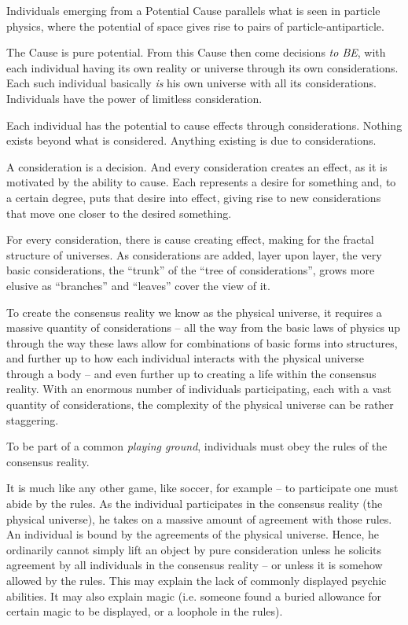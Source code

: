 \documentclass[11pt]{article}
\begin{document}
Individuals emerging from a Potential Cause parallels what is seen in particle
physics, where the potential of space gives rise to pairs of
particle-antiparticle.

The Cause is pure potential. From this Cause then come decisions {\em to BE},
with each individual having its own reality or universe through its own
considerations. Each such individual basically {\em is} his own universe with
all its considerations. Individuals have the power of limitless consideration.

Each individual has the potential to cause effects through considerations.
Nothing exists beyond what is considered. Anything existing is due to
considerations.

A consideration is a decision. And every consideration creates an effect, as it
is motivated by the ability to cause. Each represents a desire for something
and, to a certain degree, puts that desire into effect, giving rise to new
considerations that move one closer to the desired something. 

For every consideration, there is cause creating effect, making for the fractal
structure of universes. As considerations are added, layer upon layer, the very
basic considerations, the ``trunk'' of the ``tree of considerations'', grows more
elusive as ``branches'' and ``leaves'' cover the view of it.

To create the consensus reality we know as the physical universe, it requires a
massive quantity of considerations -- all the way from the basic laws of physics
up through the way these laws allow for combinations of basic forms into
structures, and further up to how each individual interacts with the physical
universe through a body -- and even further up to creating a life within the
consensus reality. With an enormous number of individuals participating, each
with a vast quantity of considerations, the complexity of the physical universe
can be rather staggering.

To be part of a common {\em playing ground}, individuals must obey the rules of
the consensus reality.

It is much like any other game, like soccer, for example -- to participate one
must abide by the rules. As the individual participates in the consensus reality
(the physical universe), he takes on a massive amount of agreement with those
rules. An individual is bound by the agreements of the physical universe.
Hence, he ordinarily cannot simply lift an object by pure consideration unless
he solicits agreement by all individuals in the consensus reality -- or unless
it is somehow allowed by the rules. This may explain the lack of commonly
displayed psychic abilities. It may also explain magic (i.e. someone found a
buried allowance for certain magic to be displayed, or a loophole in the rules).
\end{document}
